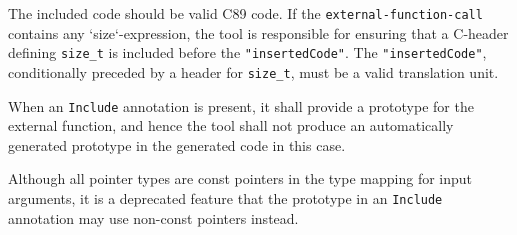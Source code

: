 \begin{itemize}
  The included code should be valid C89 code.
  If the \lstinline[language=grammar]!external-function-call! contains any `size`-expression, the tool is responsible for ensuring that a C-header defining \lstinline[language=C]!size_t! is included before the \lstinline!"insertedCode"!.
  The \lstinline!"insertedCode"!, conditionally preceded by a header for \lstinline[language=C]!size_t!, must be a valid translation unit.

  When an \lstinline!Include! annotation is present, it shall provide a prototype for the external function, and hence the tool shall not produce an automatically generated prototype in the generated code in this case.

  Although all pointer types are const pointers in the type mapping for input arguments, it is a deprecated feature that the prototype in an \lstinline!Include! annotation may use non-const pointers instead.


\end{itemize}

